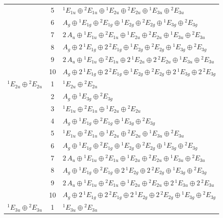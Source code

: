 \documentclass[11pt]{article}
\begin{document}
\begin{longtable}{l c p{}}
 & 5 & ${}^{1}E_{1u}\oplus {}^{2}E_{1u}\oplus {}^{1}E_{2u}\oplus {}^{2}E_{2u}\oplus {}^{1}E_{3u}\oplus {}^{2}E_{3u}$\\
 & 6 & $A_{g}\oplus {}^{1}E_{1g}\oplus {}^{2}E_{1g}\oplus {}^{1}E_{2g}\oplus {}^{2}E_{2g}\oplus {}^{1}E_{3g}\oplus {}^{2}E_{3g}$\\
 & 7 & $2\,A_{u}\oplus {}^{1}E_{1u}\oplus {}^{2}E_{1u}\oplus {}^{1}E_{2u}\oplus {}^{2}E_{2u}\oplus {}^{1}E_{3u}\oplus {}^{2}E_{3u}$\\
 & 8 & $A_{g}\oplus 2\,{}^{1}E_{1g}\oplus 2\,{}^{2}E_{1g}\oplus {}^{1}E_{2g}\oplus {}^{2}E_{2g}\oplus {}^{1}E_{3g}\oplus {}^{2}E_{3g}$\\
 & 9 & $2\,A_{u}\oplus {}^{1}E_{1u}\oplus {}^{2}E_{1u}\oplus 2\,{}^{1}E_{2u}\oplus 2\,{}^{2}E_{2u}\oplus {}^{1}E_{3u}\oplus {}^{2}E_{3u}$\\
 & 10 & $A_{g}\oplus 2\,{}^{1}E_{1g}\oplus 2\,{}^{2}E_{1g}\oplus {}^{1}E_{2g}\oplus {}^{2}E_{2g}\oplus 2\,{}^{1}E_{3g}\oplus 2\,{}^{2}E_{3g}$\\
\hline
${}^{1}E_{2u}\oplus {}^{2}E_{2u}$ & 1 & ${}^{1}E_{2u}\oplus {}^{2}E_{2u}$\\
 & 2 & $A_{g}\oplus {}^{1}E_{3g}\oplus {}^{2}E_{3g}$\\
 & 3 & ${}^{1}E_{1u}\oplus {}^{2}E_{1u}\oplus {}^{1}E_{2u}\oplus {}^{2}E_{2u}$\\
 & 4 & $A_{g}\oplus {}^{1}E_{1g}\oplus {}^{2}E_{1g}\oplus {}^{1}E_{3g}\oplus {}^{2}E_{3g}$\\
 & 5 & ${}^{1}E_{1u}\oplus {}^{2}E_{1u}\oplus {}^{1}E_{2u}\oplus {}^{2}E_{2u}\oplus {}^{1}E_{3u}\oplus {}^{2}E_{3u}$\\
 & 6 & $A_{g}\oplus {}^{1}E_{1g}\oplus {}^{2}E_{1g}\oplus {}^{1}E_{2g}\oplus {}^{2}E_{2g}\oplus {}^{1}E_{3g}\oplus {}^{2}E_{3g}$\\
 & 7 & $2\,A_{u}\oplus {}^{1}E_{1u}\oplus {}^{2}E_{1u}\oplus {}^{1}E_{2u}\oplus {}^{2}E_{2u}\oplus {}^{1}E_{3u}\oplus {}^{2}E_{3u}$\\
 & 8 & $A_{g}\oplus {}^{1}E_{1g}\oplus {}^{2}E_{1g}\oplus 2\,{}^{1}E_{2g}\oplus 2\,{}^{2}E_{2g}\oplus {}^{1}E_{3g}\oplus {}^{2}E_{3g}$\\
 & 9 & $2\,A_{u}\oplus {}^{1}E_{1u}\oplus {}^{2}E_{1u}\oplus {}^{1}E_{2u}\oplus {}^{2}E_{2u}\oplus 2\,{}^{1}E_{3u}\oplus 2\,{}^{2}E_{3u}$\\
 & 10 & $A_{g}\oplus 2\,{}^{1}E_{1g}\oplus 2\,{}^{2}E_{1g}\oplus 2\,{}^{1}E_{2g}\oplus 2\,{}^{2}E_{2g}\oplus {}^{1}E_{3g}\oplus {}^{2}E_{3g}$\\
\hline
${}^{1}E_{3u}\oplus {}^{2}E_{3u}$ & 1 & ${}^{1}E_{3u}\oplus {}^{2}E_{3u}$\\

\end{longtable}
\end{document}
